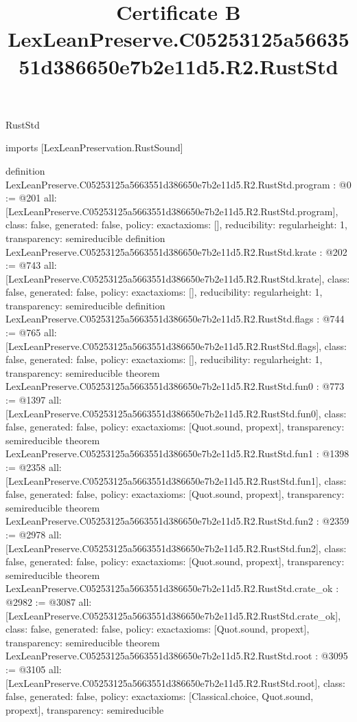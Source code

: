 \begin{lexlean}{RustStd}
\title{Certificate B LexLeanPreserve.C05253125a5663551d386650e7b2e11d5.R2.RustStd}
\begin{coremodule}
imports [LexLeanPreservation.RustSound]

definition LexLeanPreserve.C05253125a5663551d386650e7b2e11d5.R2.RustStd.program : @0 := @201 {
  all: [LexLeanPreserve.C05253125a5663551d386650e7b2e11d5.R2.RustStd.program],
  class: false,
  generated: false,
  policy: exact{axioms: []},
  reducibility: regular{height: 1},
  transparency: semireducible
}
definition LexLeanPreserve.C05253125a5663551d386650e7b2e11d5.R2.RustStd.krate : @202 := @743 {
  all: [LexLeanPreserve.C05253125a5663551d386650e7b2e11d5.R2.RustStd.krate],
  class: false,
  generated: false,
  policy: exact{axioms: []},
  reducibility: regular{height: 1},
  transparency: semireducible
}
definition LexLeanPreserve.C05253125a5663551d386650e7b2e11d5.R2.RustStd.flags : @744 := @765 {
  all: [LexLeanPreserve.C05253125a5663551d386650e7b2e11d5.R2.RustStd.flags],
  class: false,
  generated: false,
  policy: exact{axioms: []},
  reducibility: regular{height: 1},
  transparency: semireducible
}
theorem LexLeanPreserve.C05253125a5663551d386650e7b2e11d5.R2.RustStd.fun0 : @773 := @1397 {
  all: [LexLeanPreserve.C05253125a5663551d386650e7b2e11d5.R2.RustStd.fun0],
  class: false,
  generated: false,
  policy: exact{axioms: [Quot.sound, propext]},
  transparency: semireducible
}
theorem LexLeanPreserve.C05253125a5663551d386650e7b2e11d5.R2.RustStd.fun1 : @1398 := @2358 {
  all: [LexLeanPreserve.C05253125a5663551d386650e7b2e11d5.R2.RustStd.fun1],
  class: false,
  generated: false,
  policy: exact{axioms: [Quot.sound, propext]},
  transparency: semireducible
}
theorem LexLeanPreserve.C05253125a5663551d386650e7b2e11d5.R2.RustStd.fun2 : @2359 := @2978 {
  all: [LexLeanPreserve.C05253125a5663551d386650e7b2e11d5.R2.RustStd.fun2],
  class: false,
  generated: false,
  policy: exact{axioms: [Quot.sound, propext]},
  transparency: semireducible
}
theorem LexLeanPreserve.C05253125a5663551d386650e7b2e11d5.R2.RustStd.crate_ok : @2982 := @3087 {
  all: [LexLeanPreserve.C05253125a5663551d386650e7b2e11d5.R2.RustStd.crate_ok],
  class: false,
  generated: false,
  policy: exact{axioms: [Quot.sound, propext]},
  transparency: semireducible
}
theorem LexLeanPreserve.C05253125a5663551d386650e7b2e11d5.R2.RustStd.root : @3095 := @3105 {
  all: [LexLeanPreserve.C05253125a5663551d386650e7b2e11d5.R2.RustStd.root],
  class: false,
  generated: false,
  policy: exact{axioms: [Classical.choice, Quot.sound, propext]},
  transparency: semireducible
}


\end{coremodule}
\end{lexlean}
